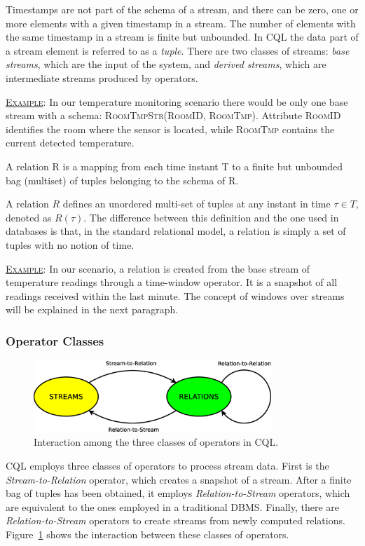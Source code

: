 Timestamps are not part of the schema of a stream, and there can be zero, one or more elements with
a given timestamp in a stream. The number of elements with the same timestamp in a stream is finite but
unbounded.
In CQL the data part of a stream element is referred to as a \textit{tuple}. There are
two classes of streams: \textit{base streams}, which are the input of the system, and \textit{derived
streams}, which are intermediate streams produced by operators. 

\underline{\textsc{Example}}: In our temperature monitoring scenario there would be only one base stream
with a schema: \textsc{RoomTmpStr(RoomID, RoomTmp)}. Attribute \textsc{RoomID} identifies the room where
the sensor is located, while \textsc{RoomTmp} contains the current detected temperature. 

\begin{definition}[Relation]{A relation R is a mapping from each time instant T to a finite but
unbounded bag (multiset) of tuples belonging to the schema of R.}
\end{definition}

A relation $R$ defines an unordered multi-set of tuples at any instant in time $\tau \in T$,
denoted as $R(\tau)$. The difference between this definition and the one used in databases is that, in
the standard relational model, a relation is simply a set of tuples with no notion of time. 

\underline{\textsc{Example}}: In our scenario, a relation is created from the base stream of
temperature readings through a time-window operator. It is a snapshot of all readings received within the last
minute. The concept of windows over streams will be explained in the next paragraph.

\subsubsection*{Operator Classes}
\begin{figure}[b]
	\centering
	\includegraphics[width=0.8\textwidth]{img/tesi/cql_ops} 
	\caption{Interaction among the three classes of operators in CQL.}
	\label{fig:cql_ops}
\end{figure}
CQL employs three classes of operators to process stream data. First is the \textit{Stream-to-Relation}
operator, which creates a snapshot of a stream. After a finite bag of tuples has been
obtained, it employs \textit{Relation-to-Stream} operators, which are equivalent to the ones employed in
a traditional DBMS. Finally, there are \textit{Relation-to-Stream} operators to create streams from
newly computed relations. Figure~\ref{fig:cql_ops} shows the interaction between these classes of
operators. 

